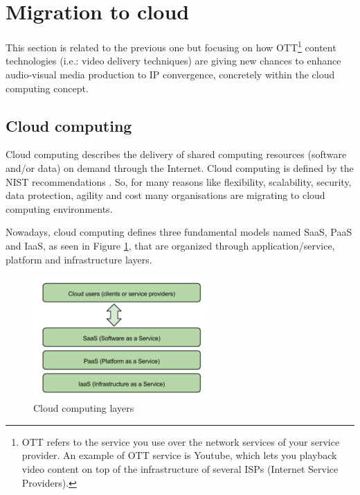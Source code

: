 \section{Migration to cloud}

This section is related to the previous one but focusing on how OTT\footnote{OTT refers to the service you use over the network services of your service provider. An example of OTT service is Youtube, which lets you playback video content on top of the infrastructure of several ISPs (Internet Service Providers).} \cite{ottVSiptv} content technologies (i.e.: video delivery techniques) are giving new chances to enhance audio-visual media production to IP convergence, concretely within the cloud computing concept. 

\subsection{Cloud computing}

Cloud computing describes the delivery of shared computing resources (software and/or data) on demand through the Internet. Cloud computing is defined by the NIST recommendations \cite{nistcc}. So, for many reasons like flexibility, scalability, security, data protection, agility and cost many organisations are migrating to cloud computing environments. 

Nowadays, cloud computing defines three fundamental models named SaaS, PaaS and IaaS, as seen in Figure \ref{F:cloudComputingLayers}, that are organized through application/service, platform and infrastructure layers.

\begin{figure}[htb]
\begin{center}
\includegraphics[width=0.6\textwidth]{./images/Cloud_computing_layers.png}
\caption{Cloud computing layers}
\label{F:cloudComputingLayers}
\end{center}
\end{figure}


